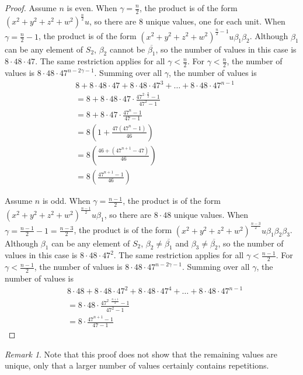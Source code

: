 \documentclass[12pt]{article}
\theoremstyle{definition}
\theoremstyle{remark}
\newtheorem{remark}[theorem]{Remark}
\numberwithin{equation}{section}
\begin{document}
\begin{proof}
Assume \( n \) is even.
When \( \gamma = \frac{n}{2} \), the product is of the form
\( (x^2 + y^2 + z^2 + w^2)^{\frac{n}{2}} u  \), so there are 8 unique values, one for
each unit.
When \( \gamma = \frac{n}{2} - 1 \), the product is of the form
\( (x^2 + y^2 + z^2 + w^2)^{\frac{n}{2} - 1} u \beta_1 \beta_2  \). Although \( \beta_1 \)
can be any element of \( S_2 \), \( \beta_2 \) cannot be \( \overline{ \beta_1 } \),
so the number of values in this case is \( 8 \cdot 48 \cdot 47 \). The same restriction
applies for all \( \gamma < \frac{n}{2} \). For \( \gamma < \frac{n}{2} \),
the number of values is \( 8 \cdot 48 \cdot 47^{n - 2\gamma - 1} \).
Summing over all \( \gamma \), the number of values is
\begin{align*}
&8 + 8 \cdot 48 \cdot 47 + 8 \cdot 48 \cdot 47^3 + \ldots
+ 8 \cdot 48 \cdot 47^{n-1}
\\
&= 8 + 8 \cdot 48 \cdot 47 \cdot \frac{47^{2 \cdot \frac{n}{2} } - 1 }{47^2 - 1}
\\
&= 8 + 8 \cdot 47 \cdot \frac{47^{n} - 1 }{47 - 1}
\\
&= 8 \left(1 +  \frac{47 (47^{n} - 1 ) }{46}\right)
\\
&= 8 \left( \frac{46 + (47^{n+1} - 47 ) }{46}\right)
\\
&= 8 \left( \frac{47^{n+1} -1 }{46}\right)
\end{align*}

Assume \( n \) is odd.
When \( \gamma = \frac{n-1}{2} \), the product is of the form
\( (x^2 + y^2 + z^2 + w^2)^{\frac{n-1}{2}} u \beta_1  \), so there are \( 8 \cdot 48 \)
unique values.
When \( \gamma = \frac{n-1}{2} - 1 = \frac{n-3}{2}  \), the product is of the form
\( (x^2 + y^2 + z^2 + w^2)^{\frac{n-3}{2}} u \beta_1 \beta_2 \beta_3  \). Although \( \beta_1 \)
can be any element of \( S_2 \), \( \beta_2 \neq \overline{ \beta_1 } \)
and \( \beta_3 \neq \overline{ \beta_2 } \),
so the number of values in this case is \( 8 \cdot 48 \cdot 47^2 \). The same restriction
applies for all \( \gamma < \frac{n-1}{2} \). For \( \gamma < \frac{n-1}{2} \),
the number of values is \( 8 \cdot 48 \cdot 47^{n - 2\gamma - 1 } \).
Summing over all \( \gamma \), the number of values is
\begin{align*}
&8 \cdot 48 + 8 \cdot 48 \cdot 47^2 + 8 \cdot 48 \cdot 47^4 + \ldots
+ 8 \cdot 48 \cdot 47^{n-1}
\\
&= 8 \cdot 48 \cdot \frac{47^{2 \cdot \frac{n+1}{2} } - 1 }{47^2 - 1}
\\
&= 8  \cdot \frac{47^{n+1} - 1 }{47 - 1}
\end{align*}
\end{proof}
\begin{remark}
Note that this proof does not show that the remaining values are unique, only that
a larger number of values certainly contains repetitions.
\end{remark}
\end{document}
